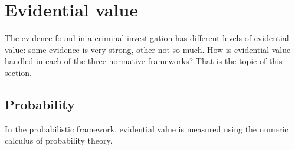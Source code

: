 \documentclass[10pt]{article}
\begin{document}
\section{Evidential value}
\label{sec:str}

The evidence found in a criminal investigation has different levels of evidential value: some evidence is very strong, other not so much. How is evidential value handled in each of the three normative frameworks? That is the topic of this section.

\subsection{Probability}

In the probabilistic framework, evidential value is measured using the numeric calculus of probability theory.

	
\end{document}
